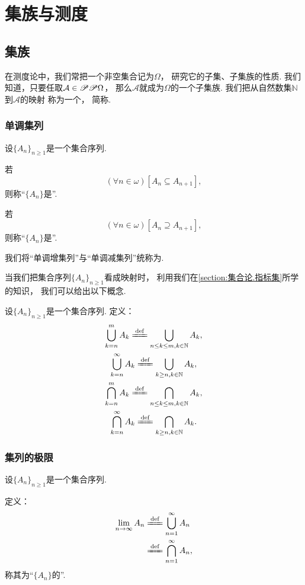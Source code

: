 \chapter{集族与测度}
\section{集族}
在测度论中，我们常把一个非空集合记为\(\Omega\)，
研究它的子集、子集族的性质.
我们知道，只要任取\(\mathcal{A} \in \mathscr{P}\mathscr{P}\Omega\)，
那么\(\mathcal{A}\)就成为\(\Omega\)的一个子集族.
我们把从自然数集\(\mathbb{N}\)到\(\mathcal{A}\)的映射
称为一个，
简称.

\subsection{单调集列}
\begin{definition}
设\(\{A_n\}_{n\geq1}\)是一个集合序列.

若\[
	(\forall n\in\omega)
	[A_n \subseteq A_{n+1}],
\]
则称“\(\{A_n\}\)是”.

若\[
	(\forall n\in\omega)
	[A_n \supseteq A_{n+1}],
\]
则称“\(\{A_n\}\)是”.

我们将“单调增集列”与“单调减集列”统称为.
\end{definition}

当我们把集合序列\(\{A_n\}_{n\geq1}\)看成映射时，
利用我们在\cref{section:集合论.指标集}所学的知识，
我们可以给出以下概念.
\begin{definition}
设\(\{A_n\}_{n\geq1}\)是一个集合序列.
定义：\begin{gather*}
	\bigcup_{k=n}^m A_k
	\defeq
	\bigcup_{n \leq k \leq m, k\in\mathbb{N}} A_k, \\
	\bigcup_{k=n}^\infty A_k
	\defeq
	\bigcup_{k \geq n, k\in\mathbb{N}} A_k, \\
	\bigcap_{k=n}^m A_k
	\defeq
	\bigcap_{n \leq k \leq m, k\in\mathbb{N}} A_k, \\
	\bigcap_{k=n}^\infty A_k
	\defeq
	\bigcap_{k \geq n, k\in\mathbb{N}} A_k.
\end{gather*}
\end{definition}

\subsection{集列的极限}
\begin{definition}
设\(\{A_n\}_{n\geq1}\)是一个集合序列.

定义：\begin{align*}
	\lim_{n\to\infty} A_n
	&\defeq \bigcup_{n=1}^\infty A_n \\
	&\defeq \bigcap_{n=1}^\infty A_n,
\end{align*}
称其为“\(\{A_n\}\)的”.
\end{definition}

